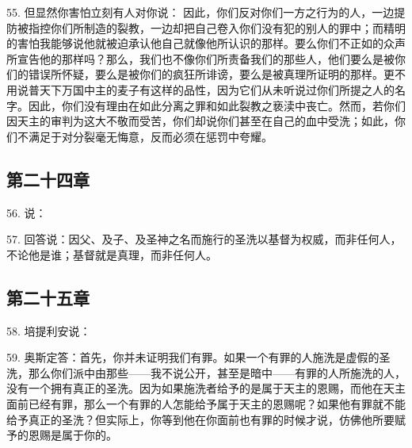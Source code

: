 55. 但显然你害怕立刻有人对你说： 因此，你们反对你们一方之行为的人，一边提防被指控你们所制造的裂教，一边却把自己卷入你们没有犯的别人的罪中；而精明的害怕我能够说他就被迫承认他自己就像他所认识的那样。要么你们不正如的众声所宣告他的那样吗？那么，我们也不像你们所责备我们的那些人，他们要么是被你们的错误所怀疑，要么是被你们的疯狂所诽谤，要么是被真理所证明的那样。更不用说普天下万国中主的麦子有这样的品性，因为它们从未听说过你们所提之人的名字。因此，你们没有理由在如此分离之罪和如此裂教之亵渎中丧亡。然而，若你们因天主的审判为这大不敬而受苦，你们却说你们甚至在自己的血中受洗；如此，你们不满足于对分裂毫无悔意，反而必须在惩罚中夸耀。\par


\subsection{第二十四章}

56. 说：\par

57. 回答说：因父、及子、及圣神之名而施行的圣洗以基督为权威，而非任何人，不论他是谁；基督就是真理，而非任何人。\par


\subsection{第二十五章}

58. 培提利安说：\par

59. 奥斯定答：首先，你并未证明我们有罪。如果一个有罪的人施洗是虚假的圣洗，那么你们派中由那些——我不说公开，甚至是暗中——有罪的人所施洗的人，没有一个拥有真正的圣洗。因为如果施洗者给予的是属于天主的恩赐，而他在天主面前已经有罪，那么一个有罪的人怎能给予属于天主的恩赐呢？如果他有罪就不能给予真正的圣洗？但实际上，你等到他在你面前也有罪的时候才说，仿佛他所要赋予的恩赐是属于你的。\par

